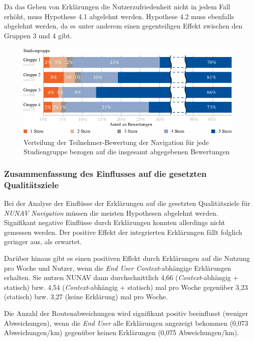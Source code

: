 Da das Geben von Erklärungen die Nutzerzufriedenheit nicht in jedem Fall erhöht, muss Hypothese 4.1 abgelehnt werden. Hypothese 4.2 muss ebenfalls abgelehnt werden, da es unter anderem einen gegenteiligen Effekt zwischen den Gruppen 3 und 4 gibt.

\begin{figure}[t!]
    \centering
    \includegraphics[width=\textwidth]{contents/06_model_evaluation/02_evaluation/res/rating_result_overview.pdf}
    \caption{Verteilung der Teilnehmer-Bewertung der Navigation für jede Studiengruppe bezogen auf die insgesamt abgegebenen Bewertungen}
    \label{fig:Rating_Result_Overview}
\end{figure}

\subsubsection{Zusammenfassung des Einflusses auf die gesetzten Qualitätsziele}

Bei der Analyse der Einflüsse der Erklärungen auf die gesetzten Qualitätsziele für \textit{NUNAV Navigation} müssen die meisten Hypothesen abgelehnt werden. Signifikant negative Einflüsse durch Erklärungen konnten allerdings nicht gemessen werden. Der positive Effekt der integrierten Erklärungen fällt folglich geringer aus, als erwartet. 

Darüber hinaus gibt es einen positiven Effekt durch Erklärungen auf die Nutzung pro Woche und Nutzer, wenn die \textit{End User} \textit{Context}-abhängige Erklärungen erhalten. Sie nutzen NUNAV dann durchschnittlich 4,66 (\textit{Context}-abhängig + statisch) bzw. 4,54 (\textit{Context}-abhängig + statisch) mal pro Woche gegenüber 3,23 (statisch) bzw. 3,27 (keine Erklärung) mal pro Woche.

Die Anzahl der Routenabweichungen wird signifikant positiv beeinflusst (weniger Abweichungen), wenn die \textit{End User} alle Erklärungen angezeigt bekommen (0,073 Abweichungen/km) gegenüber keinen Erklärungen (0,075 Abweichungen/km). 

